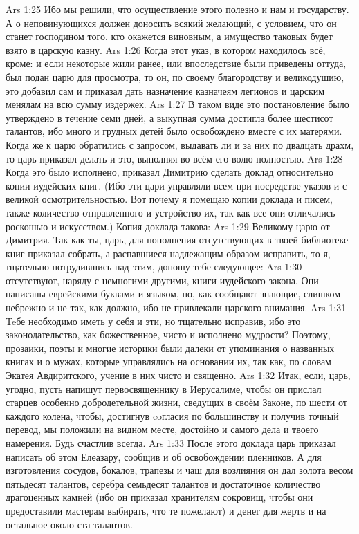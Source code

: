 \vs Ars 1:25
Ибо мы решили, что осуществление этого полезно и нам и государству. А о неповинующихся должен доносить всякий желающий, с условием, что он станет господином того, кто окажется виновным, а имущество таковых будет взято в царскую казну.
\vs Ars 1:26
Когда этот указ, в котором находилось всё, кроме: и если некоторые жили ранее, или впоследствие были приведены оттуда, был подан царю для просмотра, то он, по своему благородству и великодушию, это добавил сам и приказал дать назначение казначеям легионов и царским менялам на всю сумму издержек.
\vs Ars 1:27
В таком виде это постановление было утверждено в течение семи дней, а выкупная сумма достигла более шестисот талантов, ибо много и грудных детей было освобождено вместе с их матерями. Когда же к царю обратились с запросом, выдавать ли и за них по двадцать драхм, то царь приказал делать и это, выполняя во всём его волю полностью.
\vs Ars 1:28
Когда это было исполнено, приказал Димитрию сделать доклад относительно копии иудейских книг. (Ибо эти цари управляли всем при посредстве указов и с великой осмотрительностью. Вот почему я помещаю копии доклада и писем, также количество отправленного и устройство их, так как все они отличались роскошью и искусством.) Копия доклада такова:
\vs Ars 1:29
Великому царю от Димитрия.
Так как ты, царь, для пополнения отсутствующих в твоей библиотеке книг приказал собрать, а распавшиеся надлежащим образом исправить, то я, тщательно потрудившись над этим, доношу тебе следующее:
\vs Ars 1:30
отсутствуют, наряду с немногими другими, книги иудейского закона. Они написаны еврейскими буквами и языком, но, как сообщают знающие, слишком небрежно и не так, как должно, ибо не привлекали царского внимания.
\vs Ars 1:31
Teбе необходимо иметь у себя и эти, но тщательно исправив, ибо это законодательство, как божественное, чисто и исполнено мудрости? Поэтому, прозаики, поэты и многие историки были далеки от упоминания о названных книгах и о мужах, которые управлялись на основании их, так как, по словам Экатея Авдиритского, учение в них чисто и священно.
\vs Ars 1:32
Итак, если, царь, угодно, пусть напишут первосвященнику в Иерусалиме, чтобы он прислал старцев особенно добродетельной жизни, сведущих в своём Законе, по шести от каждого колена, чтобы, достигнув coгласия по большинству и получив точный перевод, мы положили на видном месте, достойно и самого дела и твоего намерения. Будь счастлив всегда.
\vs Ars 1:33
После этого доклада царь приказал написать об этом Елеазару, сообщив и об освобождении пленников. А для изготовления сосудов, бокалов, трапезы и чаш для возлияния он дал золота весом пятьдесят талантов, серебра семьдесят талантов и достаточное количество драгоценных камней (ибо он приказал хранителям сокровищ, чтобы они предоставили мастерам выбирать, что те пожелают) и денег для жертв и на остальное около ста талантов.
